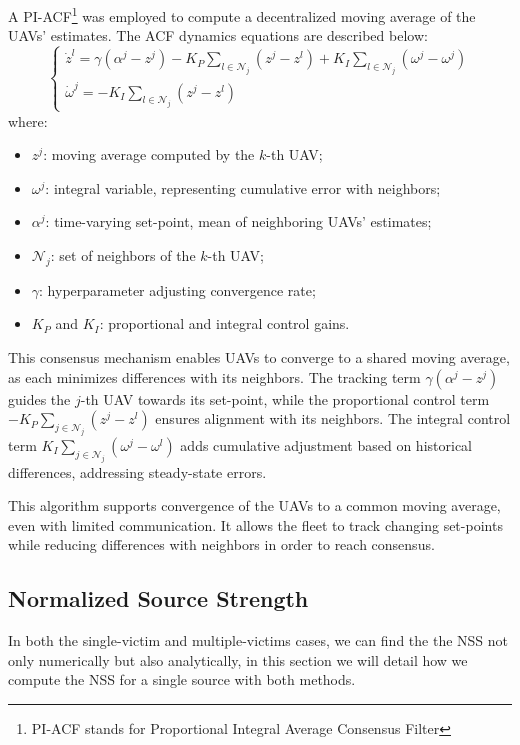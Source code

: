 A PI-ACF\footnote{PI-ACF stands for Proportional Integral Average Consensus Filter} was employed to compute 
a decentralized moving average of the UAVs' estimates. 
The ACF dynamics equations are described below:
\[
\begin{cases}
    \dot{z}^l = \gamma(\alpha^j - z^j) - K_P \sum_{l \in \mathcal{N}_j} (z^j - z^l) + K_I \sum_{l \in \mathcal{N}_j} (\omega^j - \omega^j) \\
    \dot{\omega}^j = - K_I \sum_{l \in \mathcal{N}_j} (z^j - z^l)
\end{cases}
\]
where:
\begin{itemize}
    \item \( z^j \): moving average computed by the \( k \)-th UAV;
    \item \( \omega^j \): integral variable, representing cumulative error 
    with neighbors;
    \item \( \alpha^j \): time-varying set-point, mean of neighboring UAVs' estimates;
    \item \( \mathcal{N}_j \): set of neighbors of the \( k \)-th UAV;
    \item \( \gamma \): hyperparameter adjusting convergence rate;
    \item \( K_P \) and \( K_I \): proportional and integral control gains.
\end{itemize}
This consensus mechanism enables UAVs to converge to a shared moving average, 
as each minimizes differences with its neighbors. The tracking term \( \gamma(\alpha^j - z^j) \) 
guides the \( j \)-th UAV towards its set-point, while the proportional control term 
\( -K_P \sum_{j \in \mathcal{N}_j} (z^j - z^l) \) ensures alignment with its neighbors. 
The integral control term \( K_I \sum_{j \in \mathcal{N}_j} (\omega^j - \omega^l) \) 
adds cumulative adjustment based on historical differences, addressing steady-state errors.

This algorithm supports convergence of the UAVs to a common moving average, even with 
limited communication. It allows the fleet to track changing set-points while 
reducing differences with neighbors in order to reach consensus.

\subsection{Normalized Source Strength}
In both the single-victim and multiple-victims cases, we can find the the NSS not only numerically but also
analytically, in this section we will detail how we compute the NSS for a single source with both methods.


